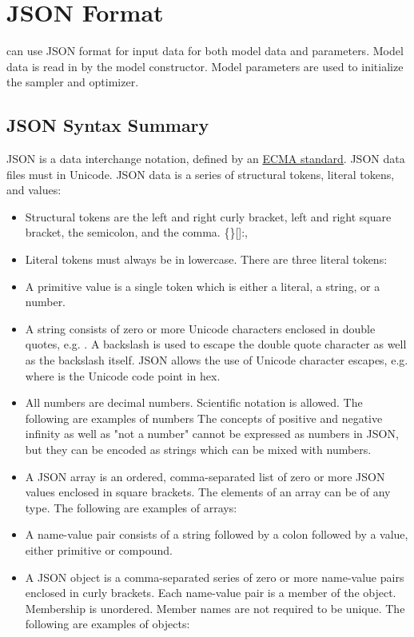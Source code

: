 \chapter{JSON Format}\label{json.chapter}

\noindent 
\CmdStan can use JSON format for input data for both
model data and parameters. Model data is read in by the model
constructor. Model parameters are used to initialize the sampler and
optimizer.

\section{JSON Syntax Summary}

JSON is a data interchange notation, defined by an 
\href{http://www.ecma-international.org/publications/files/ECMA-ST/ECMA-404.pdf}{ECMA standard}.
JSON data files must in Unicode.
JSON data is a series of structural tokens, literal tokens, and values:
\begin{itemize}
\item Structural tokens are the left and right curly bracket, left and right square bracket, the semicolon, and the comma. \{\}[]:,
\item Literal tokens must always be in lowercase. There are three literal tokens:   
\item A primitive value is a single token which is either a literal, a string, or a number.
\item A string consists of zero or more Unicode characters enclosed in
  double quotes, e.g. .  A backslash is used to escape the double quote
  character as well as the backslash itself. JSON allows the use of
  Unicode character escapes, e.g. \code{\\uHHHH}  where  is
  the Unicode code point in hex.
\item All numbers are decimal numbers. Scientific notation is
  allowed. The following are examples of numbers    The concepts of positive and negative infinity as well as
  "not a number" cannot be expressed as numbers in JSON, but they can
  be encoded as strings which can be mixed with numbers.
\item A JSON array is an ordered, comma-separated list of zero or more
  JSON values enclosed in square brackets. The elements of an array
  can be of any type.  The following are examples of arrays: \code{[] [1] ["a","b",true]}
\item A name-value pair consists of a string followed by a colon followed by a value, either primitive or compound.
\item A JSON object is a comma-separated series of zero or more
  name-value pairs enclosed in curly brackets. Each name-value pair is
  a member of the object. Membership is unordered. Member names are
  not required to be unique.  The following are examples of objects:
\end{itemize}

